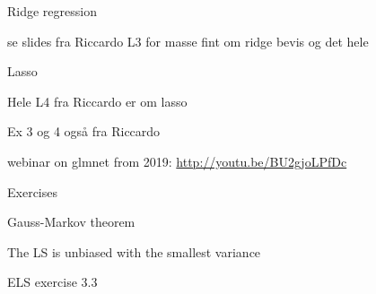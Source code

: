 \documentclass[
  ignorenonframetext,
]{beamer}
\begin{document}
\begin{frame}{Ridge regression}
\protect\hypertarget{ridge-regression}{}

se slides fra Riccardo L3 for masse fint om ridge bevis og det hele

\end{frame}

\begin{frame}{Lasso}
\protect\hypertarget{lasso}{}

Hele L4 fra Riccardo er om lasso

Ex 3 og 4 også fra Riccardo

webinar on glmnet from 2019: \url{http://youtu.be/BU2gjoLPfDc}

\end{frame}

\begin{frame}{Exercises}
\protect\hypertarget{exercises}{}

\begin{block}{Gauss-Markov theorem}

The LS is unbiased with the smallest variance

ELS exercise 3.3

\end{block}

\begin{block}{}

\end{block}

\end{frame}
\end{document}

